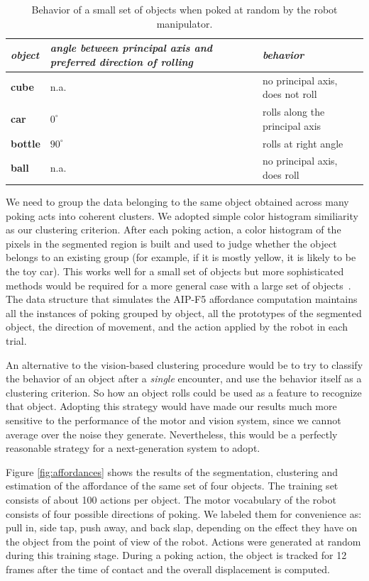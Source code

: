 \begin{table}[htbp]
\begin{center}
\begin{tabular}{|p{2cm}|p{3.5cm}|p{5cm}|}
\hline
{\it object} & {\it angle between principal axis and preferred direction of rolling} &  {\it behavior} \\ \hline\hline
{\bf cube} & n.a. & no principal axis, does not roll\\ \hline
{\bf car} & $0^\circ$ & rolls along the principal axis\\ \hline
{\bf bottle} &  $90^\circ$ & rolls at right angle\\ \hline
{\bf ball} &  n.a. & no principal axis, does roll\\ \hline
\end{tabular}
\caption{
\label{tab:affordances}
%
Behavior of a small set of objects when poked at random by the robot manipulator.
%
}
\end{center}
\end{table}

We need to group the data belonging to the same
object obtained across many poking acts into coherent clusters. We adopted simple color histogram similiarity as our clustering criterion.
After each poking action, a color histogram 
of the pixels in the segmented region is built and used 
to judge whether the object belongs to an existing group (for example, if it
is mostly yellow, it is likely to be the toy car). This works well
for a small set of objects but more sophisticated methods would be
required for a more general case with a large set of objects~\cite{schiele00recognition}.
The data structure that simulates the AIP-F5 affordance computation maintains all 
the instances of poking grouped by object, all the prototypes of the segmented object,
the direction of movement, and the action applied by the robot in each trial.

An alternative to the vision-based clustering procedure would be to 
try to classify the behavior of an object after a {\em single} encounter, and use 
the behavior itself as a clustering criterion. 
So how an object rolls could be used as a feature to recognize that object.
Adopting this strategy would have made our results much more sensitive
to the performance of the motor and vision system, since we cannot
average over the noise they generate.  Nevertheless, this would be a 
perfectly reasonable strategy for a next-generation system to adopt.

Figure \ref{fig:affordances} shows the results of the segmentation, clustering
and estimation of the affordance of the same set of four objects. The training set
consists of about 100 actions per object. The motor vocabulary of the robot
consists of four possible directions of poking. We labeled them for convenience
as: pull in, side tap, push away, and back slap, depending on the effect they
have on the object from the point of view of the robot. Actions were generated
at random during this training stage. During a poking action, the object is
tracked for 12 frames after the time of contact and the overall displacement is
computed. 

